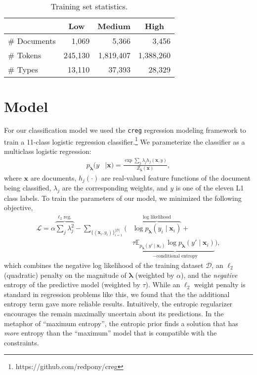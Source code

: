 \documentclass[11pt,letterpaper]{article}
\begin{document}
\begin{table}[hbt]
\small\centering
\begin{tabular}{lrrr}
  & \multicolumn{1}{c}{\textbf{Low}} & \multicolumn{1}{c}{\textbf{Medium}} & \multicolumn{1}{c}{\textbf{High}} \\
\hline
\# Documents & 1,069 & 5,366 & 3,456 \\
\# Tokens & 245,130 & 1,819,407 & 1,388,260 \\ 
\# Types & 13,110 & 37,393 & 28,329 \\ 
\end{tabular}
\caption{Training set statistics.}
\label{tbl:stats:level}
\end{table} 

\section{Model}
\label{sec:model}
For our classification model we used the \texttt{creg} regression modeling framework to train a 11-class logistic regression classifier.\footnote{https://github.com/redpony/creg}  We parameterize the classifier as a multiclass logistic regression:
\begin{align*}
p_{\boldsymbol{\lambda}}(y& \mid \textbf{x})= \frac{\exp \sum_j \lambda_j h_j(\textbf{x},y)}{Z_{\boldsymbol{\lambda}}(\textbf{x})} ,
\end{align*}
where $\textbf{x}$ are documents, $h_j(\cdot)$ are real-valued feature functions of the document being classified, $\lambda_j$ are the corresponding weights, and $y$ is one of the eleven L1 class labels. To train the parameters of our model, we minimized the following objective,
\begin{align*}
\mathcal{L} = \alpha \overbrace{\sum_j \lambda_j^2}^{\textrm{$\ell_2$ reg.}} - \sum_{\{(\textbf{x}_i,y_i )\}_{i=1}^{|\mathcal{D}|}} \Big(& \overbrace{\log p_{\boldsymbol{\lambda}}(y_i \mid \textbf{x}_i)}^{\textrm{log likelihood}}  + \\
& \tau \underbrace{\mathbb{E}_{p_{\boldsymbol{\lambda}}(y' \mid \textbf{x}_i)} \log p_{\boldsymbol{\lambda}}(y' \mid \textbf{x}_i)}_{-\textrm{conditional entropy}}\Big) ,
\end{align*}
which combines the negative log likelihood of the training dataset $\mathcal{D}$, an $\ell_2$ (quadratic) penalty on the magnitude of $\boldsymbol{\lambda}$ (weighted by $\alpha$), and the \emph{negative} entropy of the predictive model (weighted by $\tau$). While an $\ell_2$ weight penalty is standard in regression problems like this, we found that the the additional entropy term gave more reliable results. Intuitively, the entropic regularizer encourages the remain maximally uncertain about its predictions. In the metaphor of ``maximum entropy'', the entropic prior finds a solution that has \emph{more} entropy than the ``maximum'' model that is compatible with the constraints.
\end{document}

